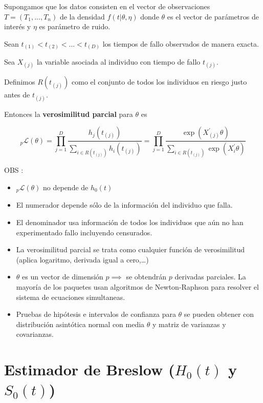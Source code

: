 \documentclass[
  a4paper,
  oneside,
  openany]{book}
\providecommand{\tightlist}{%
  \setlength{\itemsep}{0pt}\setlength{\parskip}{0pt}}
\begin{document}
Supongamos que los datos consisten en el vector de observaciones \(T = (T_1, ..., T_n)\) de la densidad \(f(t|\theta,\eta)\) donde \(\theta\) es el vector de parámetros de interés y \(\eta\) es parámetro de ruido.

Sean \(t_{(1)}<t_{(2)}<...<t_{(D)}\) los tiempos de fallo observados de manera exacta.

Sea \(X_{(j)}\) la variable asociada al individuo con tiempo de fallo \(t_{(j)}\).

Definimos \(R(t_{(j)})\) como el conjunto de todos los individuos en riesgo justo antes de \(t_{(j)}\).

Entonces la \textbf{verosimilitud parcial} para \(\theta\) es

\[
_p\mathscr{L}(\theta) = \prod_{j = 1}^{D}\frac{h_{j}(t_{(j)})}{\sum\limits_{i\in R(t_{(j)})}h_{i}(t_{(j)})} = \prod_{j = 1}^{D}\frac{\exp\left(X_{(j)}^{'}\theta\right)}{\sum\limits_{i\in R(t_{(j)})}\exp\left(X_{i}^{'}\theta\right)}
\]

OBS :

\begin{itemize}
\tightlist
\item
  \(_p\mathscr{L}(\theta)\) no depende de \(h_0(t)\)
\item
  El numerador depende sólo de la información del individuo que falla.
\item
  El denominador usa información de todos los individuos que aún no han experimentado fallo incluyendo censurados.
\item
  La verosimilitud parcial se trata como cualquier función de verosimilitud (aplica logaritmo, derivada igual a cero,\ldots)
\item
  \(\theta\) es un vector de dimensión \(p\implies\) se obtendrán \(p\) derivadas parciales. La mayoría de los paquetes usan algoritmos de Newton-Raphson para resolver el sistema de ecuaciones simultaneas.
\item
  Pruebas de hipótesis e intervalos de confianza para \(\theta\) se pueden obtener con distribución asintótica normal con media \(\theta\) y matriz de varianzas y covarianzas.
\end{itemize}

\hypertarget{estimador-de-breslow-h_0t-y-s_0t}{%
\section{\texorpdfstring{Estimador de Breslow (\(H_{0}(t)\) y \(S_{0}(t)\))}{Estimador de Breslow (H\_\{0\}(t) y S\_\{0\}(t))}}\label{estimador-de-breslow-h_0t-y-s_0t}}
\end{document}
